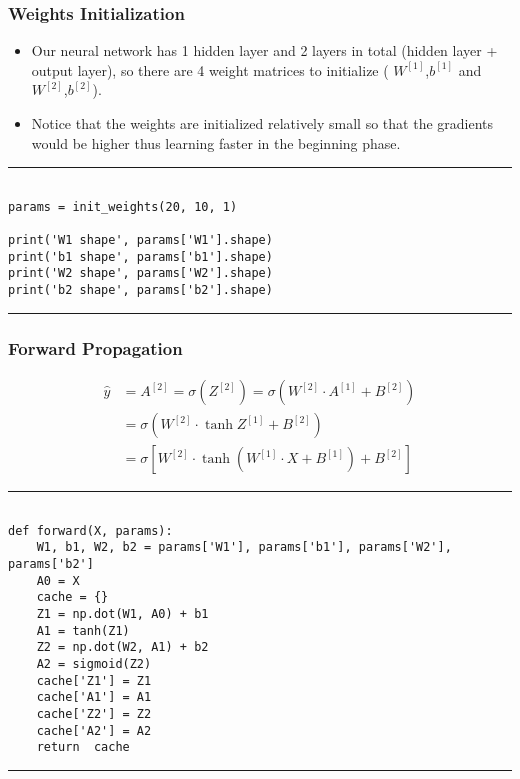 \documentclass[11pt]{beamer}
\begin{document}
\begin{frame}[fragile]
\frametitle{Weights Initialization}
\begin{itemize}
\item Our neural network has 1 hidden layer and 2 layers in total (hidden layer + output layer), so there are 4 weight matrices to initialize ( $W^{[1]}$,$b^{[1]}$  and  $W^{[2]}$,$b^{[2]}$). 
\item Notice that the weights are initialized relatively small so that the gradients would be higher thus learning faster in the beginning phase.
\end{itemize}
\rule{\textwidth}{1pt}
\scriptsize
\begin{verbatim}

params = init_weights(20, 10, 1)

print('W1 shape', params['W1'].shape)
print('b1 shape', params['b1'].shape)
print('W2 shape', params['W2'].shape)
print('b2 shape', params['b2'].shape)

\end{verbatim}
\rule{\textwidth}{1pt}
\end{frame}
\begin{frame}[fragile]
\frametitle{Forward Propagation}
\scriptsize

\begin{align*}
\hat y &= A^{[2]} = \sigma\left(Z^{[2]}\right) = \sigma \left( W^{[2]} \cdot A^{[1]} + B^{[2]} \right) \\
&= \sigma \left( W^{[2]} \cdot \tanh{Z^{[1]}} + B^{[2]} \right) \\
&= \sigma \left[ W^{[2]} \cdot \tanh\left( W^{[1]} \cdot X + B^{[1]} \right) + B^{[2]} \right]
\end{align*}

\rule{\textwidth}{1pt}
\begin{verbatim}

def forward(X, params):
    W1, b1, W2, b2 = params['W1'], params['b1'], params['W2'], params['b2']
    A0 = X
    cache = {}
    Z1 = np.dot(W1, A0) + b1
    A1 = tanh(Z1)
    Z2 = np.dot(W2, A1) + b2
    A2 = sigmoid(Z2)
    cache['Z1'] = Z1
    cache['A1'] = A1
    cache['Z2'] = Z2
    cache['A2'] = A2
    return  cache

\end{verbatim}
\rule{\textwidth}{1pt}
\end{frame}
\end{document}
